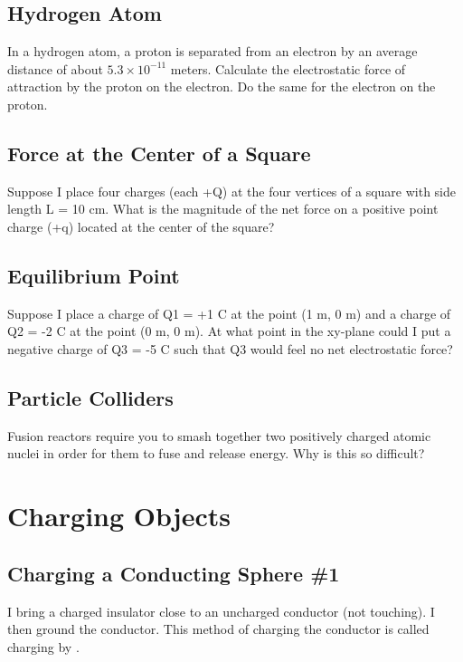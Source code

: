 \documentclass[11pt]{article}
\begin{document}
\subsection{Hydrogen Atom}
In a hydrogen atom, a proton is separated from an electron by an average distance of about $5.3 \times 10^{-11}$ meters.  Calculate the electrostatic force of attraction by the proton on the electron.  Do the same for the electron on the proton.

\subsection{Force at the Center of a Square}
Suppose I place four charges (each +Q) at the four vertices of a square with side length L = 10 cm.  What is the magnitude of the net force on a positive point charge (+q) located at the center of the square?

\subsection{Equilibrium Point}
Suppose I place a charge of Q1 = +1 C at the point (1 m, 0 m) and a charge of Q2 = -2 C at the point (0 m, 0 m).  At what point in the xy-plane could I put a negative charge of Q3 = -5 C such that Q3 would feel no net electrostatic force?

\subsection{Particle Colliders}
Fusion reactors require you to smash together two positively charged atomic nuclei in order for them to fuse and release energy.  Why is this so difficult?


\pagebreak
\section{Charging Objects}

\subsection{Charging a Conducting Sphere \#1}
I bring a charged insulator close to an uncharged conductor (not touching).  I then ground the conductor.  This method of charging the conductor is called charging by \underline{\hspace{1cm}}.
\end{document}
